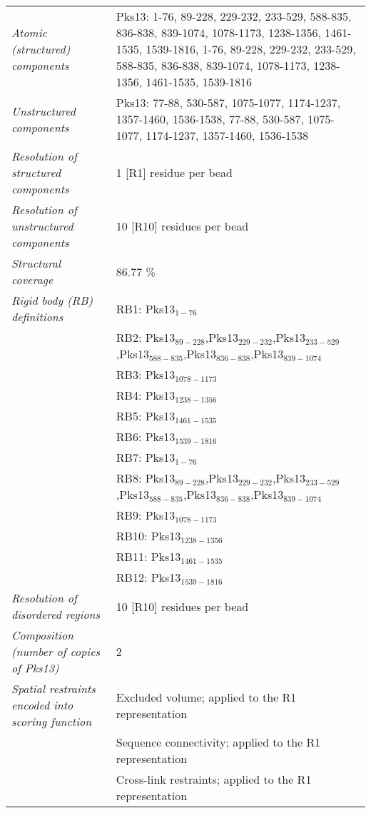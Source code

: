 \documentclass[8pt,a4paper]{article}
\begin{document}
\begin{longtable}{ p{} | p{} }
            \textit{Atomic (structured) components} & Pks13: 1-76, 89-228, 229-232, 233-529, 588-835, 836-838, 839-1074, 1078-1173, 1238-1356, 1461-1535, 1539-1816, 1-76, 89-228, 229-232, 233-529, 588-835, 836-838, 839-1074, 1078-1173, 1238-1356, 1461-1535, 1539-1816\\
                \textit{Unstructured components} & Pks13: 77-88, 530-587, 1075-1077, 1174-1237, 1357-1460, 1536-1538, 77-88, 530-587, 1075-1077, 1174-1237, 1357-1460, 1536-1538\\
                \textit{Resolution of structured components} & 1 [R1] residue per bead\\
                \textit{Resolution of unstructured components} & 10 [R10] residues per bead\\
                \textit{Structural coverage} & 86.77 \%\\
                \textit{Rigid body (RB) definitions} & RB1: Pks13$_{1-76}$\\
            & RB2: Pks13$_{89-228}$,Pks13$_{229-232}$,Pks13$_{233-529}$,Pks13$_{588-835}$,Pks13$_{836-838}$,Pks13$_{839-1074}$ \\
            & RB3: Pks13$_{1078-1173}$ \\
            & RB4: Pks13$_{1238-1356}$ \\
            & RB5: Pks13$_{1461-1535}$ \\
            & RB6: Pks13$_{1539-1816}$ \\
            & RB7: Pks13$_{1-76}$ \\
            & RB8: Pks13$_{89-228}$,Pks13$_{229-232}$,Pks13$_{233-529}$,Pks13$_{588-835}$,Pks13$_{836-838}$,Pks13$_{839-1074}$ \\
            & RB9: Pks13$_{1078-1173}$ \\
            & RB10: Pks13$_{1238-1356}$ \\
            & RB11: Pks13$_{1461-1535}$ \\
            & RB12: Pks13$_{1539-1816}$ \\
                \textit{Resolution of disordered regions} & 10 [R10] residues per bead\\
                \textit{Composition (number of copies of Pks13)} & 2\\
                \textit{Spatial restraints encoded into scoring function} & Excluded volume; applied to the R1 representation\\
            & Sequence connectivity; applied to the R1 representation \\
            & Cross-link restraints; applied to the R1 representation \\
        


\end{longtable}
\end{document}
